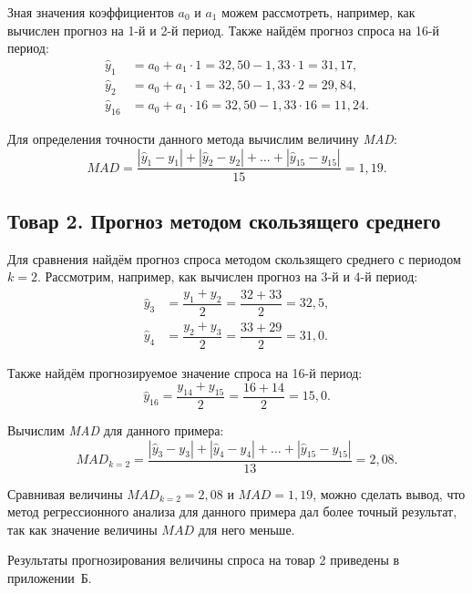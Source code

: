 Зная значения коэффициентов $a_0$ и $a_1$ можем рассмотреть, например, как
вычислен прогноз на 1-й и 2-й период. Также найдём
прогноз спроса на 16-й период:
\begin{align*}
  \hat{y}_1 &= a_0 + a_1 \cdot 1 = 32{,}50 - 1{,}33 \cdot 1 = 31{,}17 , \\
  \hat{y}_2 &= a_0 + a_1 \cdot 1 =  32{,}50 - 1{,}33 \cdot 2 = 29{,}84, \\
  \hat{y}_{16} &= a_0 + a_1 \cdot 16 =  32{,}50 - 1{,}33 \cdot 16 = 11{,}24.
\end{align*}

Для определения точности данного метода вычислим величину \textit{MAD}:
\[
  MAD = \dfrac{|\hat{y}_1 - y_1| + |\hat{y}_2 - y_2| + \dots + |\hat{y}_{15} - y_{15}|}{15} = 1{,}19.
\]


\subsection{Товар 2. Прогноз методом скользящего среднего}

Для сравнения найдём прогноз спроса методом скользящего среднего
с периодом $k = 2$. Рассмотрим, например, как вычислен прогноз
на 3-й и 4-й период:
\begin{align*}
  \hat{y}_3 &= \dfrac{y_1 + y_2}{2} = \dfrac{32 + 33}{2} = 32{,}5, \\
  \hat{y}_4 &= \dfrac{y_2 + y_3}{2} = \dfrac{33 + 29}{2} = 31{,}0.
\end{align*}

Также найдём прогнозируемое значение спроса на 16-й период:
\begin{equation*}
  \hat{y}_{16} = \dfrac{y_{14} + y_{15}}{2} = \dfrac{16 + 14}{2} = 15{,}0.
\end{equation*}

Вычислим \textit{MAD} для данного примера:
\[
  MAD_{k = 2} = \dfrac{|\hat{y}_3 - y_3| + |\hat{y}_4 - y_4| + \dots + |\hat{y}_{15} - y_{15}|}{13} = 2{,}08.
\]

Сравнивая величины $MAD_{k = 2} = 2{,}08$ и $MAD = 1{,}19$, можно сделать вывод, что
метод регрессионного анализа для данного примера дал более точный результат, так как
значение величины $MAD$ для него меньше.

Результаты прогнозирования величины спроса на товар 2 приведены в приложении~Б.
